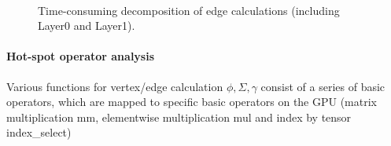 \begin{figure}
    \centering
    \\
    \caption{Time-consuming decomposition of edge calculations (including Layer0 and Layer1).}
    \label{fig:exp_edge_calc_decomposition}
\end{figure}

\paragraph{Hot-spot operator analysis}
Various functions for vertex/edge calculation $\phi, \Sigma,\gamma$ consist of a series of basic operators,
which are mapped to specific basic operators on the GPU (matrix multiplication mm, elementwise multiplication mul and index by tensor index\_select)

